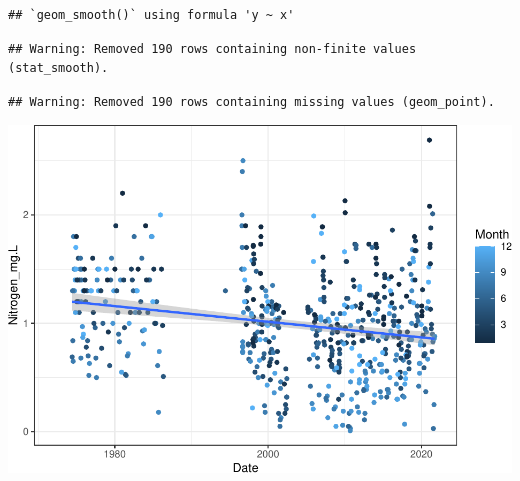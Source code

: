 \documentclass[
  12pt,
]{article}
\begin{document}
\begin{verbatim}
## `geom_smooth()` using formula 'y ~ x'
\end{verbatim}

\begin{verbatim}
## Warning: Removed 190 rows containing non-finite values (stat_smooth).
\end{verbatim}

\begin{verbatim}
## Warning: Removed 190 rows containing missing values (geom_point).
\end{verbatim}

\includegraphics{Project_Template_files/figure-latex/Nitrogen_Analysis-1.pdf}
\end{document}
